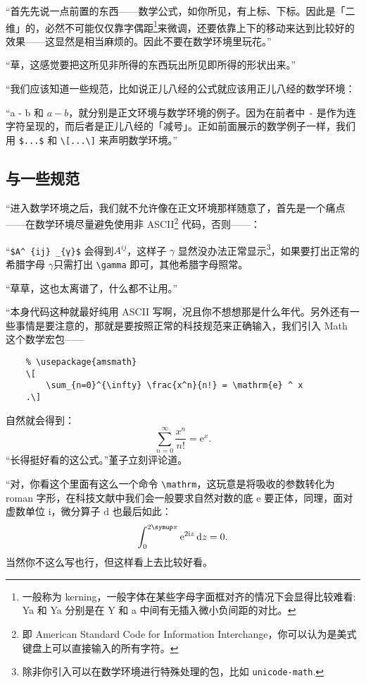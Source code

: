 “首先先说一点前置的东西——数学公式，如你所见，有上标、下标。因此是「二维」的，必然不可能仅仅靠字偶距\footnote{一般称为 kerning，一般字体在某些字母字面框对齐的情况下会显得比较难看: {Y}{a} 和 Ya 分别是在 Y 和 a 中间有无插入微小负间距的对比。}来微调，还要依靠上下的移动来达到比较好的效果——这显然是相当麻烦的。因此不要在数学环境里玩花。”

“草，这感觉要把这所见非所得的东西玩出所见即所得的形状出来。”

“我们应该知道一些规范，比如说正儿八经的公式就应该用正儿八经的数学环境：

“a - b 和 $a - b$，就分别是正文环境与数学环境的例子。因为在前者中 \verb"-" 是作为连字符呈现的，而后者是正儿八经的「减号」。正如前面展示的数学例子一样，我们用 \verb"$...$" 和 \verb"\[...\]" 来声明数学环境。”

\subsection{\AmS 与一些规范}

“进入数学环境之后，我们就不允许像在正文环境那样随意了，首先是一个痛点——在数学环境尽量避免使用非 ASCII\footnote{即
    American Standard Code for Information Interchange，你可以认为是美式键盘上可以直接输入的所有字符。} 代码，否则——：

“\verb"$A^ {ij} _{γ}$" 会得到$
    A^{ij} %
$，这样子 $\gamma $ 显然没办法正常显示\footnote{除非你引入可以在数学环境进行特殊处理的包，比如 \texttt{unicode-math}.}，如果要打出正常的希腊字母 $\gamma $只需打出 \verb"\gamma" 即可，其他希腊字母照常。

“草草，这也太离谱了，什么都不让用。”

“本身代码这种就最好纯用 ASCII 写啊，况且你不想想那是什么年代。另外还有一些事情是要注意的，那就是要按照正常的科技规范来正确输入，我们引入 \AmS{}Math 这个数学宏包——

\begin{lstlisting}
    % \usepackage{amsmath}
    \[
        \sum_{n=0}^{\infty} \frac{x^n}{n!} = \mathrm{e} ^ x
    .\]
\end{lstlisting}

自然就会得到：
\[
    \sum_{n=0}^{\infty} \frac{x^n}{n!} = \mathrm{e} ^ x
    .\]
“长得挺好看的这公式。”堇子立刻评论道。

“对，你看这个里面有这么一个命令 \verb"\mathrm"，这玩意是将吸收的参数转化为 roman 字形，在科技文献中我们会一般要求自然对数的底 $\mathrm{e}$ 要正体，同理，面对虚数单位 $\mathrm{i}$，微分算子 $\mathrm{d}$ 也最后如此：
\[
    \int_0^{2\symup\pi } \mathrm{e} ^ {2 \mathrm{i} z } \,\mathrm{d}z = 0
    .\]
当然你不这么写也行，但这样看上去比较好看。

